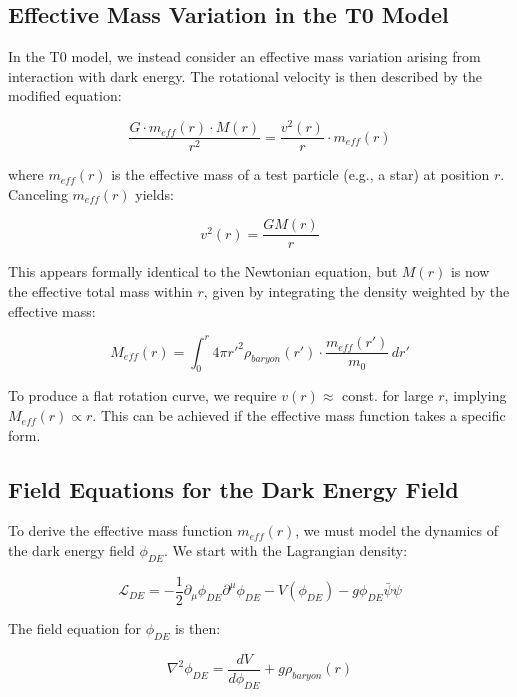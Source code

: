 \documentclass[a4paper,12pt]{article}
\begin{document}
\subsection{Effective Mass Variation in the T0 Model}

In the T0 model, we instead consider an effective mass variation arising from interaction with dark energy. The rotational velocity is then described by the modified equation:

\begin{equation}
	\frac{G \cdot m_{eff}(r) \cdot M(r)}{r^2} = \frac{v^2(r)}{r} \cdot m_{eff}(r)
\end{equation}

where $m_{eff}(r)$ is the effective mass of a test particle (e.g., a star) at position $r$. Canceling $m_{eff}(r)$ yields:

\begin{equation}
	v^2(r) = \frac{GM(r)}{r}
\end{equation}

This appears formally identical to the Newtonian equation, but $M(r)$ is now the effective total mass within $r$, given by integrating the density weighted by the effective mass:

\begin{equation}
	M_{eff}(r) = \int_0^r 4\pi r'^2 \rho_{baryon}(r') \cdot \frac{m_{eff}(r')}{m_0} \, dr'
\end{equation}

To produce a flat rotation curve, we require $v(r) \approx$ const. for large $r$, implying $M_{eff}(r) \propto r$. This can be achieved if the effective mass function takes a specific form.

\subsection{Field Equations for the Dark Energy Field}

To derive the effective mass function $m_{eff}(r)$, we must model the dynamics of the dark energy field $\phi_{DE}$. We start with the Lagrangian density:

\begin{equation}
	\mathcal{L}_{DE} = -\frac{1}{2}\partial_\mu \phi_{DE} \partial^\mu \phi_{DE} - V(\phi_{DE}) - g\phi_{DE}\bar{\psi}\psi
\end{equation}

The field equation for $\phi_{DE}$ is then:

\begin{equation}
	\nabla^2 \phi_{DE} = \frac{dV}{d\phi_{DE}} + g\rho_{baryon}(r)
\end{equation}
\end{document}
